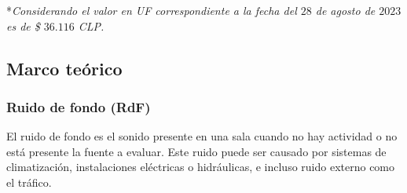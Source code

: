 *\textit{Considerando el valor en UF correspondiente a la fecha del $28$ de agosto de $2023$ es de \$ $36.116$ CLP.}


\subsection{Marco teórico}
\subsubsection{Ruido de fondo (RdF)}
El ruido de fondo es el sonido presente en una sala cuando no hay actividad o no está presente la fuente a evaluar. Este ruido puede ser causado por sistemas de climatización, instalaciones eléctricas o hidráulicas, e incluso ruido externo como el tráfico.

\begin{itemize}


\end{itemize}

